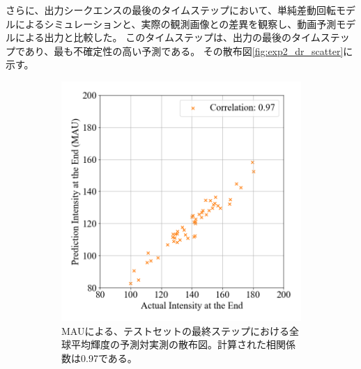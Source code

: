         さらに、出力シークエンスの最後のタイムステップにおいて、単純差動回転モデルによるシミュレーションと、実際の観測画像との差異を観察し、動画予測モデルによる出力と比較した。
        このタイムステップは、出力の最後のタイムステップであり、最も不確定性の高い予測である。
        その散布図\ref{fig:exp2_dr_scatter}に示す。
        \begin{figure}[htbp]
          \begin{subfigure}[b]{0.55\textwidth}
            \centering
            \includegraphics[width=\textwidth]{figures/exp2/intensity_scatter_gt_pd.png}
            \caption{MAUによる、テストセットの最終ステップにおける全球平均輝度の予測対実測の散布図。計算された相関係数は0.97である。}
          \end{subfigure}
          \begin{subfigure}[b]{0.55\textwidth}
            \centering

\end{subfigure}
\end{figure}

